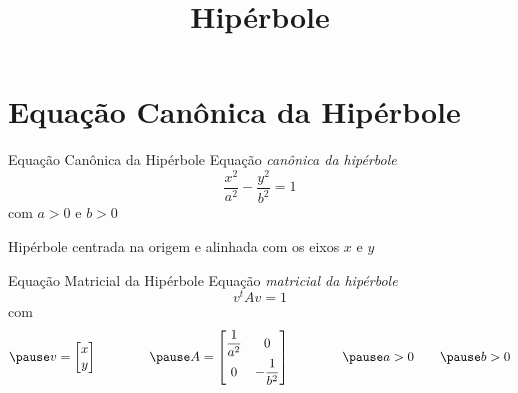 \documentclass[fleqn,aspectratio=169,12pt]{beamer}
\title{Hipérbole}
\begin{document}
\addtitle

\section{Equação Canônica da Hipérbole}

\begin{frame}{Equação Canônica da Hipérbole}
  Equação \emph{canônica da hipérbole}
  \[
    \frac{x^2}{a^2} - \frac{y^2}{b^2} = 1
  \]
  \pause
  com \(a > 0\)
  \pause
  e \(b > 0\)

  \pause
  \bigskip
  Hipérbole centrada na origem e alinhada com os eixos $x$ e $y$
\end{frame}

\begin{frame}{Equação Matricial da Hipérbole}
  Equação \emph{matricial da hipérbole}
  \[
    v^t A v = 1
  \]
  \pause
  com
  \[
    \pause
    v = \begin{bmatrix}
      x \\
      y
    \end{bmatrix}
    \qquad\qquad
    \pause
    A = \begin{bmatrix}
      \dfrac{1}{a^2} & 0              \\[2mm]
      0              & -\dfrac{1}{b^2}
    \end{bmatrix}
    \qquad\qquad
    \pause
    a > 0
    \qquad
    \pause
    b > 0
  \]
\end{frame}
\end{document}
